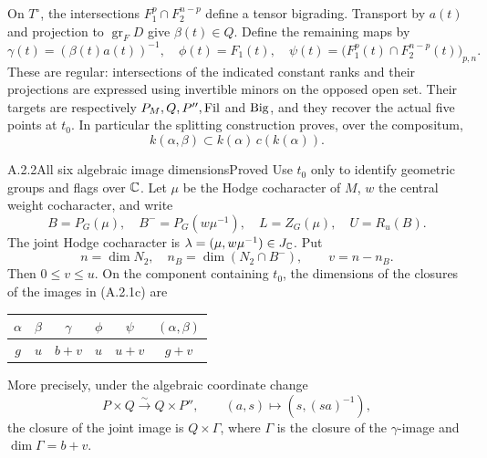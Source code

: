 On $T^\circ$, the intersections
$F_1^p\cap F_2^{n-p}$ define a tensor bigrading. Transport by $a(t)$
and projection to $\operatorname{gr}_F D$ give $\beta(t)\in Q$.
Define the remaining maps by
\[
 \gamma(t)=(\beta(t)a(t))^{-1},\quad
 \phi(t)=F_1(t),\quad
 \psi(t)=\bigl(F_1^p(t)\cap F_2^{n-p}(t)\bigr)_{p,n}.
 \tag{A.2.1c}
\]
These are regular: intersections of the indicated constant ranks and
their projections are expressed using invertible minors on the
opposed open set. Their targets are respectively $P_M,Q,P'',\mathrm{Fil}$
and $\mathrm{Big}$, and they recover the actual five points at $t_0$.
In particular the splitting construction proves, over the compositum,
\[
             k(\alpha,\beta)\subset k(\alpha)\,c(k(\alpha)).
 \tag{A.2.1d}
\]

\begin{result}{A.2.2}{All six algebraic image dimensions}{Proved}
Use $t_0$ only to identify geometric groups and flags over $\mathbb C$.
Let $\mu$ be the Hodge cocharacter of $M$, $w$ the central weight
cocharacter, and write
\[
 B=P_G(\mu),\quad B^-=P_G(w\mu^{-1}),\quad
 L=Z_G(\mu),\quad U=R_u(B).
\]
The joint Hodge cocharacter is
$\lambda=(\mu,w\mu^{-1})\in J_{\mathbb C}$. Put
\[
 n=\dim N_2,\quad n_B=\dim(N_2\cap B^-),\qquad v=n-n_B.
 \tag{A.2.2a}
\]
Then $0\leq v\leq u$. On the component containing $t_0$, the
dimensions of the closures of the images in (A.2.1c) are
\begin{center}
\begin{tabular}{c c c c c c}
\toprule
$\alpha$&$\beta$&$\gamma$&$\phi$&$\psi$&$(\alpha,\beta)$\rule{0pt}{2.4ex}\\
\midrule
$g$&$u$&$b+v$&$u$&$u+v$&$g+v$\\
\bottomrule
\end{tabular}
\end{center}
More precisely, under the algebraic coordinate change
\[
 P\times Q\xrightarrow{\sim}Q\times P'',\qquad
 (a,s)\longmapsto(s,(sa)^{-1}),
 \tag{A.2.2b}
\]
the closure of the joint image is $Q\times\Gamma$, where $\Gamma$
is the closure of the $\gamma$-image and $\dim\Gamma=b+v$.
\end{result}

